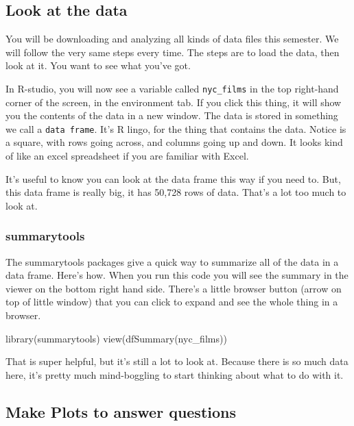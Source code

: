 \documentclass[
]{book}
\newenvironment{Shaded}{\begin{snugshade}}{\end{snugshade}}
\newcommand{\FunctionTok}[1]{\textcolor[rgb]{0.00,0.00,0.00}{#1}}
\newcommand{\NormalTok}[1]{#1}
\begin{document}
\hypertarget{look-at-the-data}{%
\subsection{Look at the data}\label{look-at-the-data}}

You will be downloading and analyzing all kinds of data files this semester. We will follow the very same steps every time. The steps are to load the data, then look at it. You want to see what you've got.

In R-studio, you will now see a variable called \texttt{nyc\_films} in the top right-hand corner of the screen, in the environment tab. If you click this thing, it will show you the contents of the data in a new window. The data is stored in something we call a \texttt{data\ frame}. It's R lingo, for the thing that contains the data. Notice is a square, with rows going across, and columns going up and down. It looks kind of like an excel spreadsheet if you are familiar with Excel.

It's useful to know you can look at the data frame this way if you need to. But, this data frame is really big, it has 50,728 rows of data. That's a lot too much to look at.

\hypertarget{summarytools}{%
\subsubsection{summarytools}\label{summarytools}}

The summarytools packages give a quick way to summarize all of the data in a data frame. Here's how. When you run this code you will see the summary in the viewer on the bottom right hand side. There's a little browser button (arrow on top of little window) that you can click to expand and see the whole thing in a browser.

\begin{Shaded}
\begin{Highlighting}[]
\FunctionTok{library}\NormalTok{(summarytools)}
\FunctionTok{view}\NormalTok{(}\FunctionTok{dfSummary}\NormalTok{(nyc\_films))}
\end{Highlighting}
\end{Shaded}

That is super helpful, but it's still a lot to look at. Because there is so much data here, it's pretty much mind-boggling to start thinking about what to do with it.

\hypertarget{make-plots-to-answer-questions}{%
\subsection{Make Plots to answer questions}\label{make-plots-to-answer-questions}}
\end{document}
